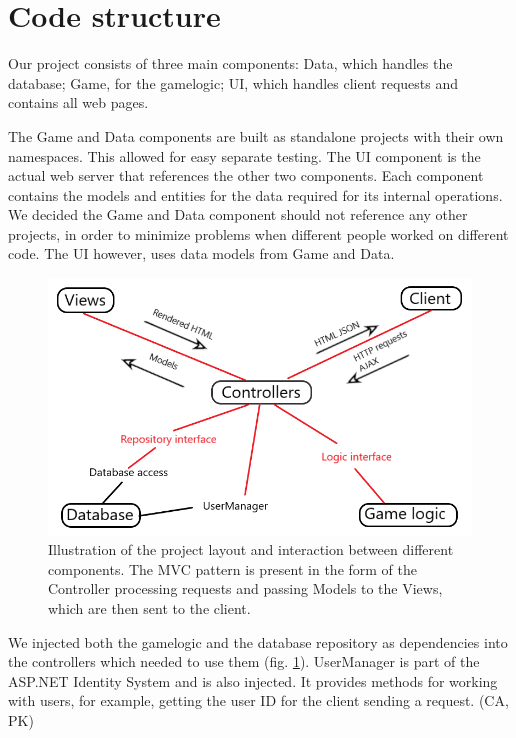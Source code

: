 \documentclass[acmlarge, review=false, screen=true]{acmart}
\begin{document}
\section{Code structure}
Our project consists of three main components: Data, which handles the database; Game, for the gamelogic; UI, which handles client requests and contains all web pages. 

The Game and Data components are built as standalone projects with their own namespaces. This allowed for easy separate testing. The UI component is the actual web server that references the other two components. Each component contains the models and entities for the data required for its internal operations. We decided the Game and Data component should not reference any other projects, in order to minimize problems when different people worked on different code. The UI however, uses data models from Game and Data.

\begin{figure}
  \includegraphics[width=\textwidth]{images/image3.png}
  \caption{Illustration of the project layout and interaction between different components. The MVC pattern is present in the form of the Controller processing requests and passing Models to the Views, which are then sent to the client.
  }
  \label{fig:project-layout}
\end{figure}

We injected both the gamelogic and the database repository as dependencies into the controllers which needed to use them (fig. \ref{fig:project-layout}). UserManager is part of the ASP.NET Identity System and is also injected. It provides methods for working with users, for example, getting the user ID for the client sending a request. (CA, PK)
\end{document}
